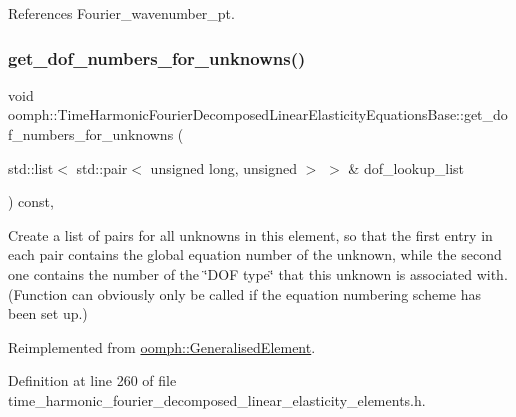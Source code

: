 References Fourier\+\_\+wavenumber\+\_\+pt.

\mbox{\label{classoomph_1_1TimeHarmonicFourierDecomposedLinearElasticityEquationsBase_ae49e9b233a22735986bf1bc3ef31502f}} 
\subsubsection{\texorpdfstring{get\+\_\+dof\+\_\+numbers\+\_\+for\+\_\+unknowns()}{get\_dof\_numbers\_for\_unknowns()}}
{\footnotesize\ttfamily void oomph\+::\+Time\+Harmonic\+Fourier\+Decomposed\+Linear\+Elasticity\+Equations\+Base\+::get\+\_\+dof\+\_\+numbers\+\_\+for\+\_\+unknowns (\begin{DoxyParamCaption}\item[{std\+::list$<$ std\+::pair$<$ unsigned long, unsigned $>$ $>$ \&}]{dof\+\_\+lookup\+\_\+list }\end{DoxyParamCaption}) const\hspace{0.3cm}{\ttfamily [inline]}, {\ttfamily [virtual]}}



Create a list of pairs for all unknowns in this element, so that the first entry in each pair contains the global equation number of the unknown, while the second one contains the number of the \char`\"{}\+D\+O\+F type\char`\"{} that this unknown is associated with. (Function can obviously only be called if the equation numbering scheme has been set up.) 



Reimplemented from \hyperlink{classoomph_1_1GeneralisedElement_a069f59bfc3e607a5bebba52c6314d777}{oomph\+::\+Generalised\+Element}.



Definition at line 260 of file time\+\_\+harmonic\+\_\+fourier\+\_\+decomposed\+\_\+linear\+\_\+elasticity\+\_\+elements.\+h.



